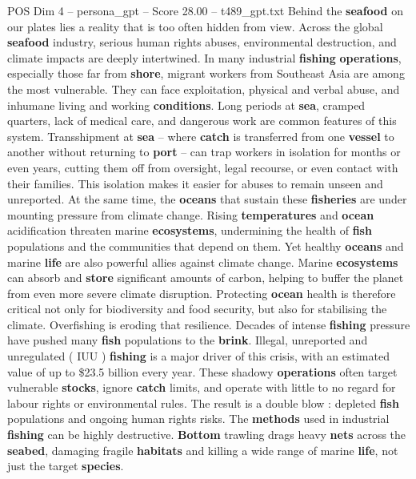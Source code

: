 \begin{textsample}{POS Dim 4 – persona\_gpt – Score 28.00 – t489\_gpt.txt}  \label{ex:f4_pos_025}
Behind the \textbf{seafood} on our plates lies a reality that is too often hidden from view.
Across the global \textbf{seafood} industry, serious human rights abuses, environmental destruction, and climate impacts are deeply intertwined.
In many industrial \textbf{fishing} \textbf{operations}, especially those far from \textbf{shore}, migrant workers from Southeast Asia are among the most vulnerable.
They can face exploitation, physical and verbal abuse, and inhumane living and working \textbf{conditions}.
Long periods at \textbf{sea}, cramped quarters, lack of medical care, and dangerous work are common features of this system.
Transshipment at \textbf{sea} – where \textbf{catch} is transferred from one \textbf{vessel} to another without returning to \textbf{port} – can trap workers in isolation for months or even years, cutting them off from oversight, legal recourse, or even contact with their families.
This isolation makes it easier for abuses to remain unseen and unreported.
At the same time, the \textbf{oceans} that sustain these \textbf{fisheries} are under mounting pressure from climate change.
Rising \textbf{temperatures} and \textbf{ocean} acidification threaten marine \textbf{ecosystems}, undermining the health of \textbf{fish} populations and the communities that depend on them.
Yet healthy \textbf{oceans} and marine \textbf{life} are also powerful allies against climate change.
Marine \textbf{ecosystems} can absorb and \textbf{store} significant amounts of carbon, helping to buffer the planet from even more severe climate disruption.
Protecting \textbf{ocean} health is therefore critical not only for biodiversity and food security, but also for stabilising the climate.
Overfishing is eroding that resilience.
Decades of intense \textbf{fishing} pressure have pushed many \textbf{fish} populations to the \textbf{brink}.
Illegal, unreported and unregulated ( IUU ) \textbf{fishing} is a major driver of this crisis, with an estimated value of up to \$23.5 billion every year.
These shadowy \textbf{operations} often target vulnerable \textbf{stocks}, ignore \textbf{catch} limits, and operate with little to no regard for labour rights or environmental rules.
The result is a double blow : depleted \textbf{fish} populations and ongoing human rights risks.
The \textbf{methods} used in industrial \textbf{fishing} can be highly destructive. \textbf{Bottom} trawling drags heavy \textbf{nets} across the \textbf{seabed}, damaging fragile \textbf{habitats} and killing a wide range of marine \textbf{life}, not just the target \textbf{species}.

\end{textsample}
